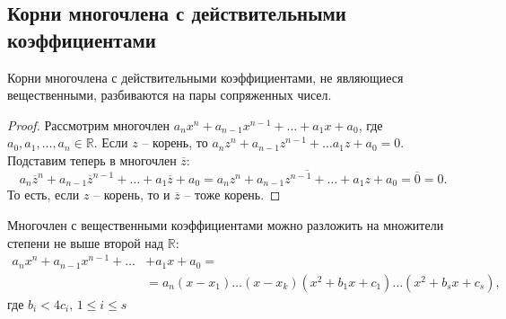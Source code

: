 \documentclass[12pt, a4paper]{article}
\begin{document}
    \subsection{Корни многочлена с действительными коэффициентами}
    \begin{lem}
        Корни многочлена с действительными коэффициентами, не являющиеся вещественными, разбиваются на пары сопряженных чисел.
        
    \end{lem}
    \begin{proof}
        Рассмотрим многочлен \( a_{n}x^{n} + a_{n-1}x^{n-1} + \ldots + a_{1}x + a_{0}   \), где \( a_{0}, a_{1}, \ldots , a_{n} \in \mathbb{R} \). Если \( z \) -- корень, то \( a_{n}z^{n} + a_{n-1}z^{n-1} + \ldots a_{1}z + a_{0} = 0 \). Подставим теперь в многочлен \( \overline{z} \): \[
            a_{n}\overline{z}^{n} + a_{n-1}\overline{z}^{n - 1} + \ldots + a_{1}\overline{z} + a_{0} = \overline{a_{n} z^{n} + a_{n-1}z^{n-1} + \ldots + a_{1}z + a_{0}  } = \overline{0} = 0.
        \] То есть, если \( z \) -- корень, то и \( \overline{z} \) -- тоже корень.   
    \end{proof}
    \begin{cor}
        Многочлен с вещественными коэффициентами можно разложить на множители степени не выше второй над \( \mathbb{R} \):
        \begin{align*}
            a_{n}x^{n} + a_{n-1}x^{n-1} + \ldots &+ a_{1}x + a_{0} = \\
                                                                  &= a_{n}(x - x_{1})\ldots (x - x_{k})(x^2 + b_{1}x + c_{1})\ldots (x^2 + b_{s}x + c_{s}),
        \end{align*} где \( b_{i} < 4c_{i}, \, 1 \le i \le s \)
    \end{cor}
\end{document}
